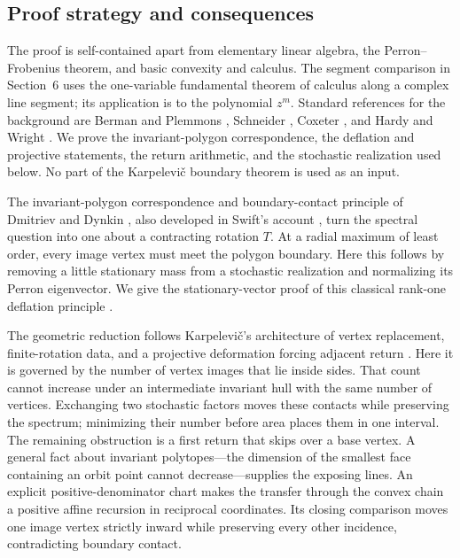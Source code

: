 \documentclass[11pt,a4paper]{article}
\theoremstyle{definition}
\theoremstyle{remark}
\numberwithin{equation}{section}
\begin{document}
\subsection*{Proof strategy and consequences}

The proof is self-contained apart from elementary linear algebra, the Perron--Frobenius theorem, and basic convexity and calculus. The segment comparison in Section~6 uses the one-variable fundamental theorem of calculus along a complex line segment; its application is to the polynomial $z^m$. Standard references for the background are Berman and Plemmons \cite{BermanPlemmons}, Schneider \cite{Schneider}, Coxeter \cite{Coxeter}, and Hardy and Wright \cite{HardyWright}. We prove the invariant-polygon correspondence, the deflation and projective statements, the return arithmetic, and the stochastic realization used below. No part of the Karpelevi\v{c} boundary theorem is used as an input.

The invariant-polygon correspondence and boundary-contact principle of Dmitriev and Dynkin \cite{DD}, also developed in Swift's account \cite{Swift}, turn the spectral question into one about a contracting rotation $T$. At a radial maximum of least order, every image vertex must meet the polygon boundary. Here this follows by removing a little stationary mass from a stochastic realization and normalizing its Perron eigenvector. We give the stationary-vector proof of this classical rank-one deflation principle \cite{Brauer,Goddard}.

The geometric reduction follows Karpelevi\v{c}'s architecture of vertex replacement, finite-rotation data, and a projective deformation forcing adjacent return \cite{Karp}. Here it is governed by the number of vertex images that lie inside sides. That count cannot increase under an intermediate invariant hull with the same number of vertices. Exchanging two stochastic factors moves these contacts while preserving the spectrum; minimizing their number before area places them in one interval. The remaining obstruction is a first return that skips over a base vertex. A general fact about invariant polytopes---the dimension of the smallest face containing an orbit point cannot decrease---supplies the exposing lines. An explicit positive-denominator chart makes the transfer through the convex chain a positive affine recursion in reciprocal coordinates. Its closing comparison moves one image vertex strictly inward while preserving every other incidence, contradicting boundary contact.
\end{document}
